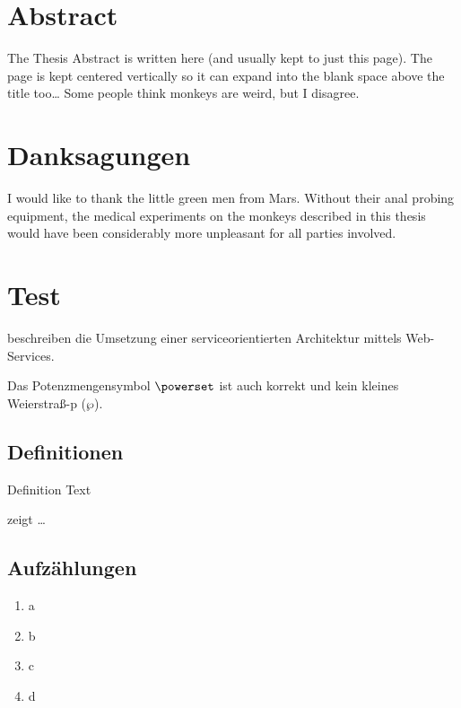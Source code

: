 \documentclass[paper=a5,twoside,fontsize=10pt, DIV=calc, headings=small,bibliography=totoc, listof=totoc]{scrbook}
\begin{document}
\chapter*{Abstract}
The Thesis Abstract is written here (and usually kept to just this page). The page is kept centered vertically so it can expand into the blank space above the title too\ldots
Some people think monkeys are weird, but I disagree.
\clearpage

\chapter*{Danksagungen}
I would like to thank the little green men from Mars. Without their anal probing equipment, the medical experiments on the monkeys described in this thesis would have been considerably more unpleasant for all parties involved.
\clearpage

\pagestyle{scrheadings}

\chapter{Test}
\label{chap:test}

\citeauthor{WSPA} \cite{WSPA} beschreiben die Umsetzung einer serviceorientierten Architektur mittels Web-Services.

Das Potenzmengensymbol $\powerset$ ist auch korrekt und kein kleines Weierstraß-p ($\wp$).

\section{Definitionen}
\begin{definition}[Title]
\label{def:def1}
Definition Text
\end{definition}

 zeigt \ldots


\section{Aufzählungen}
\begin{enumerate}[label=\alph*)]
\item a
\item b
\item c
\item d
\end{enumerate}
\end{document}
